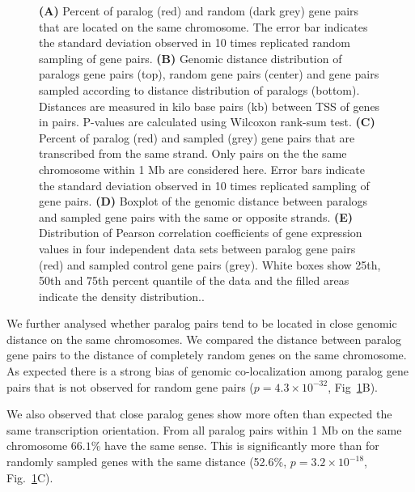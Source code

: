 \documentclass[a4paper,twoside=true,openright,parskip=full,chapterprefix=true,11pt,headings=normal,bibliography=totoc,listof=totoc,titlepage=on,captions=tableabove,draft=false]{scrreprt}
\theoremstyle{definition}
\theoremstyle{definition}
\theoremstyle{definition}
\theoremstyle{remark}
\begin{document}
\begin{figure}
\caption{\textbf{(A)} Percent of paralog (red) and random (dark
grey) gene pairs that are located on the same chromosome. The error bar
indicates the standard deviation observed in 10 times replicated random
sampling of gene pairs. \textbf{(B)} Genomic distance distribution of
paralogs gene pairs (top), random gene pairs (center) and gene pairs
sampled according to distance distribution of paralogs (bottom).
Distances are measured in kilo base pairs (kb) between TSS of genes in
pairs. P-values are calculated using Wilcoxon rank-sum test.
\textbf{(C)} Percent of paralog (red) and sampled (grey) gene pairs that
are transcribed from the same strand. Only pairs on the the same
chromosome within 1 Mb are considered here. Error bars indicate the
standard deviation observed in 10 times replicated sampling of gene
pairs. \textbf{(D)} Boxplot of the genomic distance between paralogs and
sampled gene pairs with the same or opposite strands. \textbf{(E)}
Distribution of Pearson correlation coefficients of gene expression
values in four independent data sets between paralog gene pairs (red)
and sampled control gene pairs (grey). White boxes show 25th, 50th and
75th percent quantile of the data and the filled areas indicate the
density distribution..}\label{fig:paraData}
\end{figure}





















We further analysed whether paralog pairs tend to be located in close
genomic distance on the same chromosomes. We compared the distance
between paralog gene pairs to the distance of completely random genes on
the same chromosome. As expected there is a strong bias of genomic
co-localization among paralog gene pairs that is not observed for random
gene pairs (\(p=4.3\times10^{-32}\), Fig~\ref{fig:paraData}B).

We also observed that close paralog genes show more often than expected
the same transcription orientation. From all paralog pairs within 1 Mb
on the same chromosome \(66.1\%\) have the same sense. This is
significantly more than for randomly sampled genes with the same
distance (52.6\%, \(p=3.2\times10^{-18}\), Fig.~\ref{fig:paraData}C).
\end{document}
